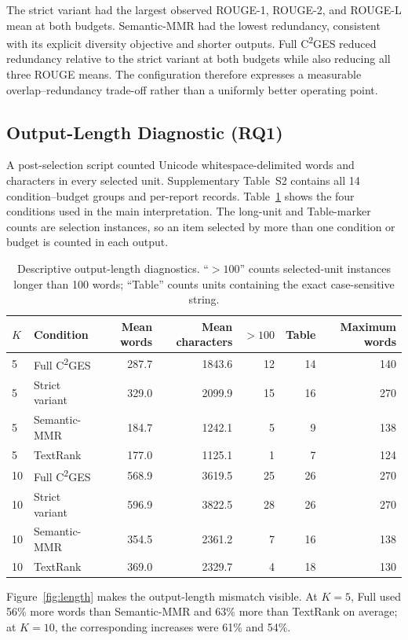\documentclass[applsci,article,submit,moreauthors]{Definitions/mdpi}
\newcommand{\cges}{C\textsuperscript{2}GES}
\begin{document}
The strict variant had the largest observed ROUGE-1, ROUGE-2, and ROUGE-L mean at both budgets. Semantic-MMR had the lowest redundancy, consistent with its explicit diversity objective and shorter outputs. Full \cges{} reduced redundancy relative to the strict variant at both budgets while also reducing all three ROUGE means. The configuration therefore expresses a measurable overlap--redundancy trade-off rather than a uniformly better operating point.

\subsection{Output-Length Diagnostic (RQ1)}

A post-selection script counted Unicode whitespace-delimited words and characters in every selected unit. Supplementary Table~S2 contains all 14 condition--budget groups and per-report records. Table~\ref{tab:length-audit} shows the four conditions used in the main interpretation. The long-unit and Table-marker counts are selection instances, so an item selected by more than one condition or budget is counted in each output.

\begin{table}[H]
\caption{Descriptive output-length diagnostics. ``$>100$'' counts selected-unit instances longer than 100 words; ``Table'' counts units containing the exact case-sensitive string.}
\label{tab:length-audit}\centering\small
\begin{tabular}{llrrrrr}
\toprule
$K$ & Condition & Mean words & Mean characters & $>100$ & Table & Maximum words\\
\midrule
5 & Full \cges{} & 287.7 & 1843.6 & 12 & 14 & 140\\
5 & Strict variant & 329.0 & 2099.9 & 15 & 16 & 270\\
5 & Semantic-MMR & 184.7 & 1242.1 & 5 & 9 & 138\\
5 & TextRank & 177.0 & 1125.1 & 1 & 7 & 124\\
10 & Full \cges{} & 568.9 & 3619.5 & 25 & 26 & 270\\
10 & Strict variant & 596.9 & 3822.5 & 28 & 26 & 270\\
10 & Semantic-MMR & 354.5 & 2361.2 & 7 & 16 & 138\\
10 & TextRank & 369.0 & 2329.7 & 4 & 18 & 130\\
\bottomrule
\end{tabular}
\end{table}

Figure~\ref{fig:length} makes the output-length mismatch visible. At $K=5$, Full used 56\% more words than Semantic-MMR and 63\% more than TextRank on average; at $K=10$, the corresponding increases were 61\% and 54\%.
\end{document}
